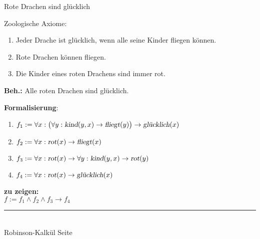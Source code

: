 \documentclass{slides}
\newcommand{\myrule}{\rule{20cm}{1mm}\\ }
\newcounter{mypage}
\begin{document}
\begin{slide}{}
\normalsize
\begin{center}
Rote Drachen sind glücklich 
\end{center}
\vspace{0.5cm}

\footnotesize
Zoologische Axiome:
\begin{enumerate}
\item Jeder Drache ist glücklich, wenn alle seine Kinder fliegen können.
\item Rote Drachen können fliegen.
\item Die Kinder eines roten Drachens sind immer rot.
\end{enumerate}
\textbf{Beh.:} Alle roten Drachen sind glücklich.

\textbf{Formalisierung}:
\begin{enumerate}
\item $f_1 := \forall x: \big(\forall y: \textsl{kind}(y,x) \rightarrow \textsl{fliegt}(y)\big) \rightarrow \textsl{glücklich}(x)$
\item $f_2 := \forall x: \textsl{rot}(x) \rightarrow \textsl{fliegt}(x)$
\item $f_3 := \forall x: \textsl{rot}(x) \rightarrow \forall y: \textsl{kind}(y,x) \rightarrow \textsl{rot}(y)$
\item $f_4 := \forall x: \textsl{rot}(x) \rightarrow \textsl{glücklich}(x)$
\end{enumerate}
\textbf{zu zeigen:} \\[0.1cm]
\hspace*{1.3cm} $f := f_1 \wedge f_2 \wedge f_3 \rightarrow f_4$ \\[0.1cm]


\vspace*{\fill}
\tiny \addtocounter{mypage}{1}
\myrule
Robinson-Kalkül \hspace*{\fill} Seite 
\end{slide}

\end{document}
